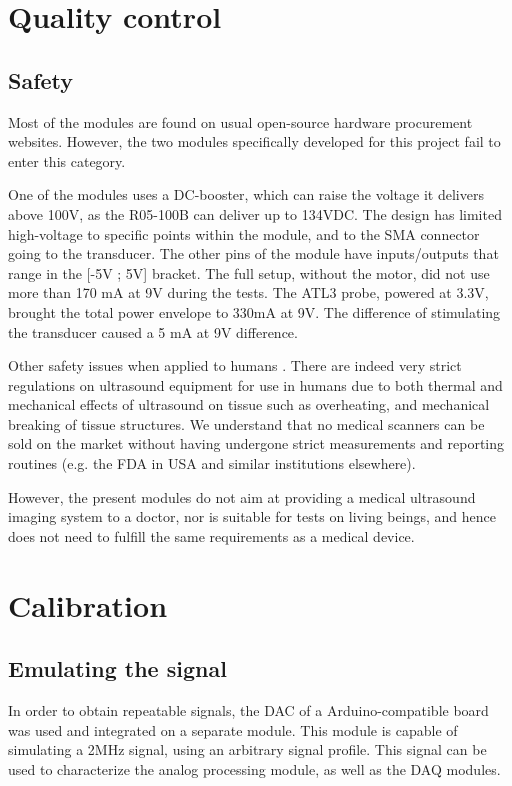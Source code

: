 \documentclass[letterpaper, 10 pt, conference]{ieeeconf} %
\begin{document}
\section{Quality control}

\subsection{Safety}
Most of the modules are found on usual open-source hardware procurement websites. However, the two modules specifically developed for this project fail to enter this category.

One of the modules uses a DC-booster, which can raise the voltage it delivers above 100V, as the R05-100B can deliver up to 134VDC. The design has limited high-voltage to specific points within the module, and to the SMA connector going to the transducer. The other pins of the module have inputs/outputs that range in the [-5V ; 5V] bracket. The full setup, without the motor, did not use more than 170 mA at 9V during the tests. The ATL3 probe, powered at 3.3V, brought the total power envelope to 330mA at 9V. The difference of stimulating the transducer caused a 5 mA at 9V difference.

Other safety issues when applied to humans \cite{c24}. There are indeed very strict regulations on ultrasound equipment for use in humans due to both thermal and mechanical effects of ultrasound on tissue such as overheating, and mechanical breaking of tissue structures. We understand that no medical scanners can be sold on the market without having undergone strict measurements and reporting routines (e.g. the FDA in USA and similar institutions elsewhere). 

However, the present modules do not aim at providing a medical ultrasound imaging system to a doctor, nor is suitable for tests on living beings, and hence does not need to fulfill the same requirements as a medical device. 


\section{Calibration}

\subsection{Emulating the signal}

In order to obtain repeatable signals, the DAC of a Arduino-compatible board was used and integrated on a separate module. This module is capable of simulating a 2MHz signal, using an arbitrary signal profile. This signal can be used to characterize the analog processing module, as well as the DAQ modules. 
\end{document}
